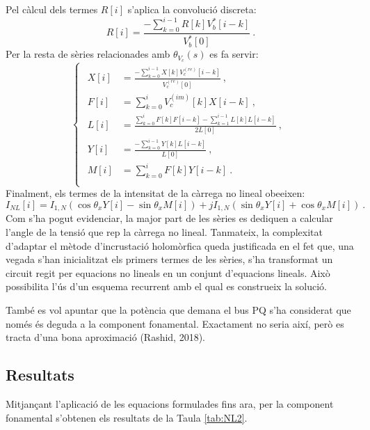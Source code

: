 Pel càlcul dels termes $R[i]$ s'aplica la convolució discreta:
\begin{equation}
    R[i]=\frac{-\sum_{k=0}^{i-1}R[k]V^*_b[i-k]}{V^*_b[0]}\ .
    \label{eq:Hx8}
\end{equation}
Per la resta de sèries relacionades amb $\theta_{V_c}(s)$ es fa servir:
\begin{equation}
    \begin{cases}
    \begin{split}
    X[i]&=\frac{-\sum_{k=0}^{i-1}X[k]V_c^{(re)}[i-k]}{V_c^{(re)}[0]}\ ,\\
    F[i]&=\sum_{k=0}^iV_c^{(im)}[k]X[i-k]\ ,\\
    L[i]&=\frac{\sum_{k=0}^iF[k]F[i-k]-\sum_{k=1}^{i-1}L[k]L[i-k]}{2L[0]}\ ,\\
    Y[i]&=\frac{-\sum_{k=0}^{i-1}Y[k]L[i-k]}{L[0]}\ ,\\
    M[i]&=\sum_{k=0}^iF[k]Y[i-k]\ .\\
    \end{split}
\end{cases}
    \label{eq:Hx9}
\end{equation}
Finalment, els termes de la intensitat de la càrrega no lineal obeeixen:
\begin{equation}
    I_{NL}[i]=I_{1,N}(\cos\theta_xY[i]-\sin\theta_xM[i])+jI_{1,N}(\sin\theta_xY[i]+\cos\theta_xM[i])\ .
    \label{eq:Hx10}
\end{equation}
Com s'ha pogut evidenciar, la major part de les sèries es dediquen a calcular l'angle de la tensió que rep la càrrega no lineal. Tanmateix, la complexitat d'adaptar el mètode d'incrustació holomòrfica queda justificada en el fet que, una vegada s'han inicialitzat els primers termes de les sèries, s'ha transformat un circuit regit per equacions no lineals en un conjunt d'equacions lineals. Això possibilita l'ús d'un esquema recurrent amb el qual es construeix la solució.

També es vol apuntar que la potència que demana el bus PQ s'ha considerat que només és deguda a la component fonamental. Exactament no seria així, però es tracta d'una bona aproximació (Rashid, 2018).

\subsection{Resultats}
Mitjançant l'aplicació de les equacions formulades fins ara, per la component fonamental s'obtenen els resultats de la Taula \ref{tab:NL2}. 


